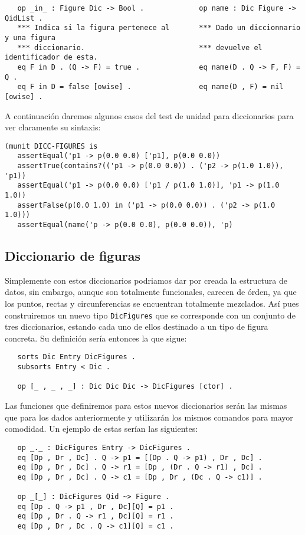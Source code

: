{\codesize
\begin{verbatim}
   op _in_ : Figure Dic -> Bool .             op name : Dic Figure -> QidList .
   *** Indica si la figura pertenece al       *** Dado un diccionnario y una figura 
   *** diccionario.                           *** devuelve el identificador de esta.
   eq F in D . (Q -> F) = true .              eq name(D . Q -> F, F) = Q .
   eq F in D = false [owise] .                eq name(D , F) = nil [owise] . 
\end{verbatim}
}

A continuación daremos algunos casos del test de unidad para diccionarios para ver claramente su sintaxis:

{\codesize
\begin{verbatim}
(munit DICC-FIGURES is
   assertEqual('p1 -> p(0.0 0.0) ['p1], p(0.0 0.0))
   assertTrue(contains?(('p1 -> p(0.0 0.0)) . ('p2 -> p(1.0 1.0)), 'p1))
   assertEqual('p1 -> p(0.0 0.0) ['p1 / p(1.0 1.0)], 'p1 -> p(1.0 1.0))
   assertFalse(p(0.0 1.0) in ('p1 -> p(0.0 0.0)) . ('p2 -> p(1.0 1.0)))
   assertEqual(name('p -> p(0.0 0.0), p(0.0 0.0)), 'p)
\end{verbatim}
}


\subsection{Diccionario de figuras}

Simplemente con estos diccionarios podriamos dar por creada la estructura de datos, sin embargo, aunque son totalmente funcionales, carecen de órden, ya que los puntos, rectas y circunferencias se encuentran totalmente mezclados. Así pues construiremos un nuevo tipo \texttt{DicFigures} que se corresponde con un conjunto de tres diccionarios, estando cada uno de ellos destinado a un tipo de figura concreta. Su definición sería entonces la que sigue:

{\codesize
\begin{verbatim}
   sorts Dic Entry DicFigures .
   subsorts Entry < Dic .

   op [_ , _ , _] : Dic Dic Dic -> DicFigures [ctor] .
\end{verbatim}
}

Las funciones que definiremos para estos nuevos diccionarios serán las mismas que para los dados anteriormente y utilizarán los mismos comandos para mayor comodidad. Un ejemplo de estas serían las siguientes:\par

{\codesize
\begin{verbatim}
   op _._ : DicFigures Entry -> DicFigures .
   eq [Dp , Dr , Dc] . Q -> p1 = [(Dp . Q -> p1) , Dr , Dc] .
   eq [Dp , Dr , Dc] . Q -> r1 = [Dp , (Dr . Q -> r1) , Dc] .
   eq [Dp , Dr , Dc] . Q -> c1 = [Dp , Dr , (Dc . Q -> c1)] .

   op _[_] : DicFigures Qid ~> Figure .
   eq [Dp . Q -> p1 , Dr , Dc][Q] = p1 .
   eq [Dp , Dr . Q -> r1 , Dc][Q] = r1 .
   eq [Dp , Dr , Dc . Q -> c1][Q] = c1 . 
\end{verbatim}
}

